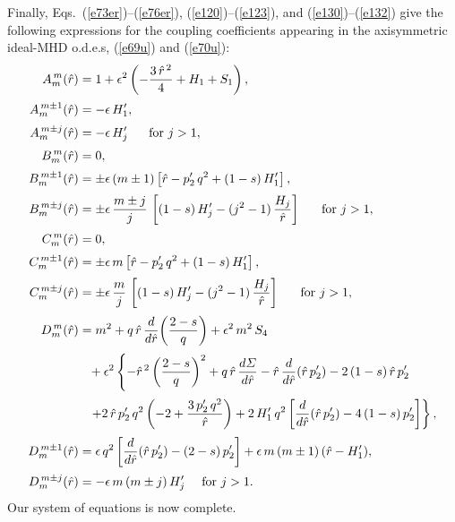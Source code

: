 \documentclass[12pt,prb,aps]{revtex4-1}
\begin{document}
Finally, Eqs.~(\ref{e73er})--(\ref{e76er}), (\ref{e120})--(\ref{e123}), and (\ref{e130})--(\ref{e132}) give the following expressions for the coupling coefficients appearing
in the axisymmetric ideal-MHD o.d.e.s, (\ref{e69u}) and (\ref{e70u}): 
\begin{align}
A_m^{\,m}(\hat{r}) &= 1 + \epsilon^2\left(-\frac{3\,\hat{r}^{\,2}}{4} + H_1+S_1\right),\\[0.5ex]
A_m^{\,m\pm 1}(\hat{r}) &= - \epsilon\,H_1',\\[0.5ex]
A_m^{\,m\pm j}(\hat{r}) &= -\epsilon\,H_j'~~~~~\mbox{for $j>1$},\\[0.5ex]
B_m^{\,m}(\hat{r}) &= 0,\\[0.5ex]
B_m^{\,m\pm 1}(\hat{r}) &= \pm \epsilon\,(m\pm 1)\left[\hat{r}-p_2'\,q^2+(1-s)\,H_1'\right],\\[0.5ex]
B_m^{\,m\pm j}(\hat{r}) &= \pm\epsilon\,\frac{m\pm j}{j}\,\left[(1-s)\,H_j'- (j^2-1)\,\frac{H_j}{\hat{r}}\right]~~~~~\mbox{for $j>1$},\\[0.5ex]
C_m^{\,m}(\hat{r}) &= 0,\\[0.5ex]
C_m^{\,m\pm 1}(\hat{r}) &= \pm \epsilon\,m\left[\hat{r}-p_2'\,q^2+(1-s)\,H_1'\right],\\[0.5ex]
C_m^{\,m\pm j}(\hat{r}) &= \pm\epsilon\,\frac{m}{j}\,\left[(1-s)\,H_j'- (j^2-1)\,\frac{H_j}{\hat{r}}\right]~~~~~\mbox{for $j>1$},\\[0.5ex]
D_m^{\,m}(\hat{r}) &= m^2 + q\,\hat{r}\,\frac{d}{d\hat{r}}\!\left(\frac{2-s}{q}\right) +\epsilon^2\,m^2\,S_4\nonumber\\[0.5ex]
&\phantom{=}+\epsilon^2\left\{-\hat{r}^{\,2}\left(\frac{2-s}{q}\right)^2+q\,\hat{r}\,\frac{d{\mit\Sigma}}{d\hat{r}}- \hat{r}\,\frac{d}{d\hat{r}}(\hat{r}\,p_2') -2\,(1-s)\,\hat{r}\,p_2'
\right.\nonumber\\[0.5ex]
&\phantom{=}\left.+2\,\hat{r}\,p_2'\,q^2\left(-2 + \frac{3\,p_2'\,q^2}{\hat{r}}\right) + 2\,H_1'\,q^2\left[\frac{d}{d\hat{r}}(\hat{r}\,p_2')-4\,(1-s)\,p_2'\right]\right\},\\[0.5ex]
D_m^{\,m\pm 1}(\hat{r}) &=\epsilon\,q^2\left[\frac{d}{d\hat{r}}(\hat{r}\,p_2') - (2-s)\,p_2'\right] + \epsilon\,m\,(m\pm 1)\,(\hat{r}-H_1'),\\[0.5ex]
D_m^{\,m\pm j}(\hat{r}) &= -\epsilon\,m\,(m\pm j)\,H_j'~~~~\mbox{for $j>1$}.
\end{align}
Our system of equations is now complete. 
\end{document}
